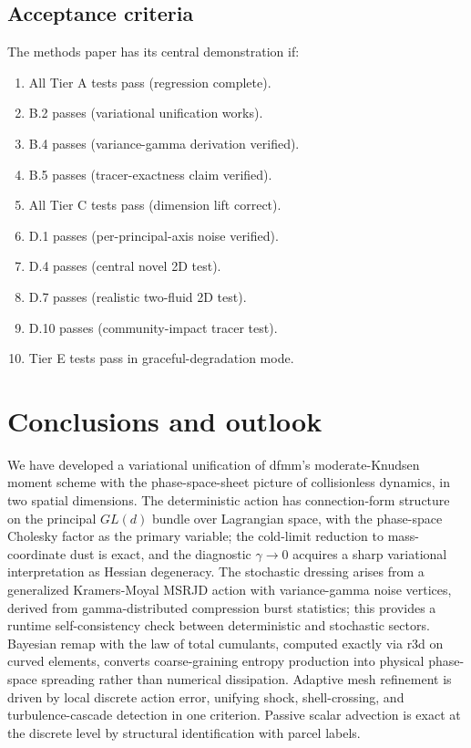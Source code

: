 \documentclass[11pt]{article}
\begin{document}
\subsection{Acceptance criteria}
\label{sec:tier-acceptance}

The methods paper has its central demonstration if:
\begin{enumerate}[label=(\arabic*)]
\item All Tier A tests pass (regression complete).
\item B.2 passes (variational unification works).
\item B.4 passes (variance-gamma derivation verified).
\item B.5 passes (tracer-exactness claim verified).
\item All Tier C tests pass (dimension lift correct).
\item D.1 passes (per-principal-axis noise verified).
\item D.4 passes (central novel 2D test).
\item D.7 passes (realistic two-fluid 2D test).
\item D.10 passes (community-impact tracer test).
\item Tier E tests pass in graceful-degradation mode.
\end{enumerate}

\section{Conclusions and outlook}
\label{sec:conclusions}

We have developed a variational unification of dfmm's
moderate-Knudsen moment scheme with the phase-space-sheet picture of
collisionless dynamics, in two spatial dimensions. The deterministic
action has connection-form structure on the principal $GL(d)$ bundle
over Lagrangian space, with the phase-space Cholesky factor as the
primary variable; the cold-limit reduction to mass-coordinate dust is
exact, and the diagnostic $\gamma\to 0$ acquires a sharp variational
interpretation as Hessian degeneracy. The stochastic dressing arises
from a generalized Kramers-Moyal MSRJD action with variance-gamma
noise vertices, derived from gamma-distributed compression burst
statistics; this provides a runtime self-consistency check between
deterministic and stochastic sectors. Bayesian remap with the law of
total cumulants, computed exactly via r3d on curved elements, converts
coarse-graining entropy production into physical phase-space spreading
rather than numerical dissipation. Adaptive mesh refinement is driven
by local discrete action error, unifying shock, shell-crossing, and
turbulence-cascade detection in one criterion. Passive scalar
advection is exact at the discrete level by structural identification
with parcel labels.
\end{document}
